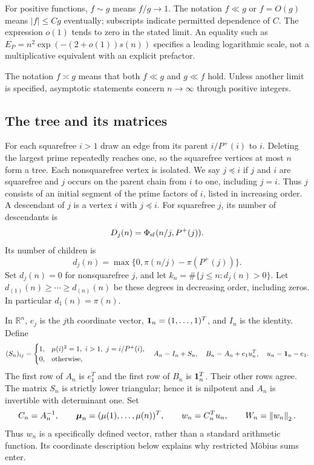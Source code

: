 For positive functions, $f\sim g$ means $f/g\to1$. The notation $f\ll g$ or $f=O(g)$ means $|f|\le Cg$ eventually; subscripts indicate permitted dependence of $C$. The expression $o(1)$ tends to zero in the stated limit. An equality such as $E_P=n^2\exp(-(2+o(1))s(n))$ specifies a leading logarithmic scale, not a multiplicative equivalent with an explicit prefactor.

The notation $f\asymp g$ means that both $f\ll g$ and $g\ll f$ hold. Unless another limit is specified, asymptotic statements concern $n\to\infty$ through positive integers.

\subsection{The tree and its matrices}

For each squarefree $i>1$ draw an edge from its parent $i/P^+(i)$ to $i$. Deleting the largest prime repeatedly reaches one, so the squarefree vertices at most $n$ form a tree. Each nonsquarefree vertex is isolated. We say $j\preceq i$ if $j$ and $i$ are squarefree and $j$ occurs on the parent chain from $i$ to one, including $j=i$. Thus $j$ consists of an initial segment of the prime factors of $i$, listed in increasing order. A descendant of $j$ is a vertex $i$ with $j\preceq i$. For squarefree $j$, its number of descendants is
\[
 D_j(n)=\Phi_{\mathrm{sf}}(n/j,P^+(j)).
\]
Its number of children is
\begin{equation}\label{def:degree}
 d_j(n)=\max\{0,\pi(n/j)-\pi(P^+(j))\}.
\end{equation}
Set $d_j(n)=0$ for nonsquarefree $j$, and let $k_n=\#\{j\le n:d_j(n)>0\}$. Let $d_{(1)}(n)\ge\cdots\ge d_{(n)}(n)$ be these degrees in decreasing order, including zeros. In particular $d_1(n)=\pi(n)$.

In $\mathbb R^n$, $e_j$ is the $j$th coordinate vector, $\mathbf{1}_n=(1,\ldots,1)^T$, and $I_n$ is the identity. Define
\begin{equation}\label{def:matrices}
 (S_n)_{ij}=\begin{cases}1,&\mu(i)^2=1,\ i>1,\ j=i/P^+(i),\\0,&\text{otherwise},\end{cases}
 \quad A_n=I_n+S_n,\quad
 B_n=A_n+e_1u_n^T,\quad u_n=\one_n-e_1.
\end{equation}
The first row of $A_n$ is $e_1^T$ and the first row of $B_n$ is $\mathbf{1}_n^T$. Their other rows agree. The matrix $S_n$ is strictly lower triangular; hence it is nilpotent and $A_n$ is invertible with determinant one. Set
\begin{equation}\label{def:vectors}
 C_n=A_n^{-1},\qquad
 \boldsymbol{\mu}_n=(\mu(1),\ldots,\mu(n))^T,\qquad
 w_n=C_n^Tu_n,\qquad W_n=\left\lVert w_n\right\rVert_2.
\end{equation}
Thus $w_n$ is a specifically defined vector, rather than a standard arithmetic function. Its coordinate description below explains why restricted M\"obius sums enter.

